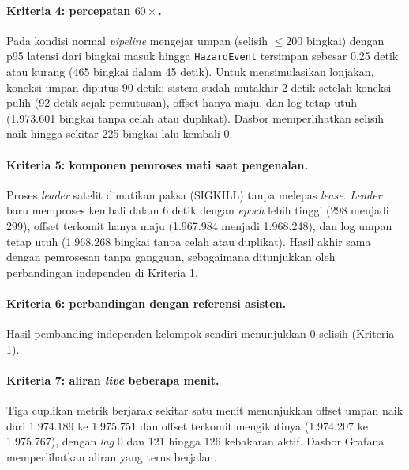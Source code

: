\paragraph*{Kriteria 4: percepatan $60\times$.}
Pada kondisi normal \textit{pipeline} mengejar umpan (selisih $\le 200$ bingkai) dengan p95 latensi dari bingkai masuk hingga \texttt{HazardEvent} tersimpan sebesar 0,25 detik atau kurang (465 bingkai dalam 45 detik). Untuk mensimulasikan lonjakan, koneksi umpan diputus 90 detik: sistem sudah mutakhir 2 detik setelah koneksi pulih (92 detik sejak pemutusan), offset hanya maju, dan log tetap utuh (1.973.601 bingkai tanpa celah atau duplikat). Dasbor memperlihatkan selisih naik hingga sekitar 225 bingkai lalu kembali 0.

\paragraph*{Kriteria 5: komponen pemroses mati saat pengenalan.}
Proses \textit{leader} satelit dimatikan paksa (SIGKILL) tanpa melepas \textit{lease}. \textit{Leader} baru memproses kembali dalam 6 detik dengan \textit{epoch} lebih tinggi (298 menjadi 299), offset terkomit hanya maju (1.967.984 menjadi 1.968.248), dan log umpan tetap utuh (1.968.268 bingkai tanpa celah atau duplikat). Hasil akhir sama dengan pemrosesan tanpa gangguan, sebagaimana ditunjukkan oleh perbandingan independen di Kriteria 1.

\paragraph*{Kriteria 6: perbandingan dengan referensi asisten.}
Hasil pembanding independen kelompok sendiri menunjukkan 0 selisih (Kriteria 1). 

\paragraph*{Kriteria 7: aliran \textit{live} beberapa menit.}
Tiga cuplikan metrik berjarak sekitar satu menit menunjukkan offset umpan naik dari 1.974.189 ke 1.975.751 dan offset terkomit mengikutinya (1.974.207 ke 1.975.767), dengan \textit{lag} 0 dan 121 hingga 126 kebakaran aktif. Dasbor Grafana memperlihatkan aliran yang terus berjalan.

